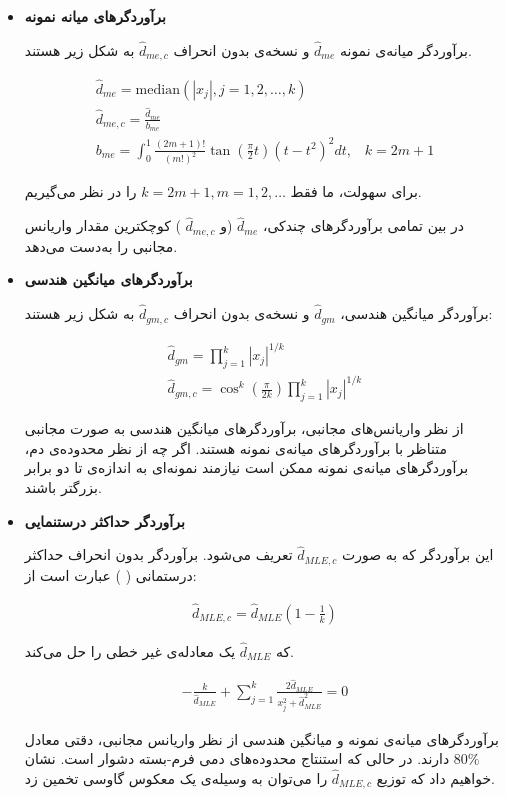 \begin{itemize}
\item
\textbf{
برآوردگرهای میانه نمونه
}

برآوردگر‌ میانه‌ی نمونه 
$\hat{d}_{me}$
و نسخه‌ی بدون انحراف 
$\hat{d}_{me,c}$
به شکل زیر هستند.

\begin{align}
\hat{d}_{me} = \mathrm{median} \left( \left| x_j \right|, j=1,2, \ldots, k \right)\\
\hat{d}_{me,c} = \frac{\hat{d}_{me}}{b_{me}}\\
b_{me} = \int_0^1 \frac{(2m+1)!}{(m!)^2} \tan \left( \frac{\pi}{2} t \right) \left( t - t^2 \right)^2 dt, \;\;\; k = 2m+1
\label{eq:1iT}
\end{align}

برای سهولت، ما فقط 
$k = 2m+1, m = 1,2, \ldots$
را در نظر می‌گیریم.

در بین تمامی برآوردگرهای چندکی، 
$\hat{d}_{me}$
(و 
$\hat{d}_{me,c}$
) کوچکترین مقدار واریانس مجانبی را به‌دست می‌دهد.

\item
\textbf{
برآوردگرهای میانگین هندسی
}

برآوردگر میانگین هندسی، 
$\hat{d}_{gm}$
و نسخه‌ی بدون انحراف 
$\hat{d}_{gm,c}$
به شکل زیر هستند:

\begin{align}
\hat{d}_{gm} = \prod_{j=1}^k \left| x_j \right|^{1/k}\\
\hat{d}_{gm,c} = \cos^k \left( \frac{\pi}{2k} \right) \prod_{j=1}^k \left| x_j \right|^{1/k}
\label{eq:1iU.0}
\end{align}

از نظر واریانس‌های مجانبی، برآوردگرهای میانگین هندسی به صورت مجانبی متناظر با برآوردگرهای میانه‌ی نمونه هستند. اگر چه از نظر محدوده‌ی دم، برآوردگرهای میانه‌ی نمونه ممکن است نیازمند نمونه‌ای به اندازه‌ی تا دو برابر بزرگتر باشند.

\item
\textbf{
برآوردگر حداکثر درستنمایی
}

این برآوردگر که به صورت 
$\hat{d}_{MLE,c}$
تعریف می‌شود. برآوردگر بدون انحراف حداکثر درستمانی (
) عبارت است از:

\begin{align}
\hat{d}_{MLE,c} = \hat{d}_{MLE} \left( 1 - \frac{1}{k} \right)
\label{eq:1iU.1}
\end{align}

که 
$\hat{d}_{MLE}$
یک معادله‌ی غیر خطی 
را حل می‌کند.

\begin{align}
- \frac{k}{\hat{d}_{MLE}} + \sum_{j=1}^k \frac{2\hat{d}_{MLE}}{x_j^2 + \hat{d}_{MLE}^2 } = 0
\label{eq:1iV}
\end{align}

برآوردگرهای میانه‌ی نمونه و میانگین هندسی از نظر واریانس مجانبی، دقتی معادل 
$80\%$
دارند. در حالی که استنتاج محدوده‌های دمی فرم-بسته دشوار است. نشان‌ خواهیم داد که توزیع 
$\hat{d}_{MLE,c}$
را می‌توان به وسیله‌ی یک معکوس گاوسی%
تخمین زد.

\end{itemize}



